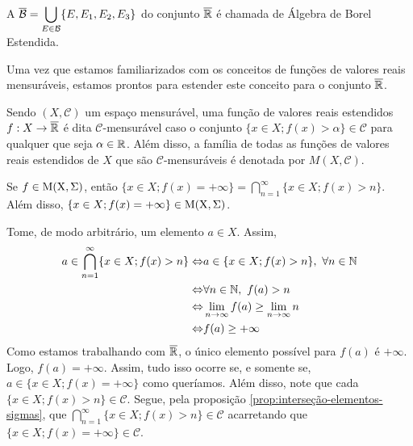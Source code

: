     \begin{definition}
    \label{def:algebra-borel-estendida}
        A \sigal $\overline{\operatorname{\mathcal{B}}} = \displaystyle \bigcup_{E \in \operatorname{\mathcal{B}}} \{E, E_1, E_2, E_3\}$ do conjunto $\operatorname{\overline{\mathbb{R}}}$ é chamada de Álgebra de Borel Estendida. 
    \end{definition}

    Uma vez que estamos familiarizados com os conceitos de funções de valores reais mensuráveis, estamos prontos para estender este conceito para o conjunto $\operatorname{\overline{\mathbb{R}}}$.

    \begin{definition}
    \label{def:familia-funcoes-mensuraveis}
        Sendo $(X, \mathcal{C})$ um espaço mensurável, uma função de valores reais estendidos $f: X \to \operatorname{\overline{\mathbb{R}}}$ é dita $\mathcal{C}$-mensurável caso o conjunto
        $\{x \in X; f(x) > \alpha\} \in \mathcal{C}$ para qualquer que seja $\alpha \in \mathbb{R}$. Além disso, a família de todas as funções de valores reais estendidos de $X$ que são $\mathcal{C}$-mensuráveis é denotada por $M(X, \mathcal{C})$.
    \end{definition}

    \begin{proposition}
    \label{prop:identidade-intersecao-mais-infinito}
        Se $f \in \operatorname{M(X, \Sigma)}$, então $\{x \in X; f(x) = +\infty\} = \displaystyle \bigcap_{n = 1}^\infty \{x \in X; f(x) > n\}$.
        Além disso, $\{x \in X; f(x) = +\infty\} \in \operatorname{M(X, \Sigma)}$.
    \end{proposition}

    \begin{prova}
        Tome, de modo arbitrário, um elemento $a \in X$. 
        Assim, 
        \begin{align*}
            a \in \bigcap_{n = 1}^\infty \{x \in X; f(x) > n\} 
            \Leftrightarrow & a \in \{x \in X; f(x) > n\}, \ \forall n \in \N\\
            \Leftrightarrow & \forall n \in \N,\ f(a) > n\\
            \Leftrightarrow & \dlim_{n \to \infty} f(a) \geq \dlim_{n \to \infty} n\\
            \Leftrightarrow & f(a) \geq +\infty  
        \end{align*}
    Como estamos trabalhando com $\operatorname{\overline{\mathbb{R}}}$, o único elemento possível para $f(a)$ é $+\infty$.
    Logo, $f(a)  = + \infty$. Assim, tudo isso ocorre se, e somente se, $a \in \{x \in X; f(x) = +\infty\}$ como queríamos.
    Além disso, note que cada $\{x \in X; f(x) > n\} \in \mathcal{C}$.
    Segue, pela proposição \ref{prop:interseção-elementos-sigmas}, que $\displaystyle \bigcap_{n = 1}^\infty \{x \in X; f(x) > n\} \in \mathcal{C}$ acarretando que $\{x \in X; f(x) = +\infty\} \in \mathcal{C}$. 
    \end{prova}

